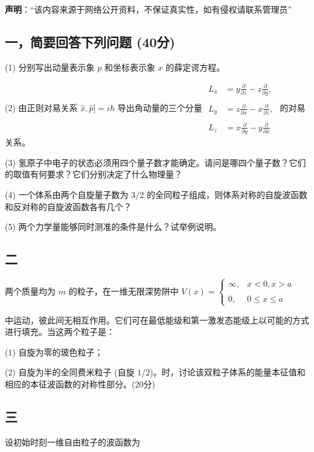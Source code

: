 
\textbf{声明}：“该内容来源于网络公开资料，不保证真实性，如有侵权请联系管理员”

\subsection{一，简要回答下列问题 (40分)}

(1) 分别写出动量表示象 $p$ 和坐标表示象 $x$ 的薛定谔方程。

(2) 由正则对易关系 $\hat{x}, \hat{p}] = i\hbar$ 导出角动量的三个分量
$\begin{aligned}    L_x &= y \frac{\partial}{\partial z} - z \frac{\partial}{\partial y}, \\\\    L_y &= z \frac{\partial}{\partial x} - x \frac{\partial}{\partial z}, \\\\    L_z &= x \frac{\partial}{\partial y} - y \frac{\partial}{\partial x}\end{aligned}$
的对易关系。

(3) 氢原子中电子的状态必须用四个量子数才能确定。请问是哪四个量子数？它们的取值有何要求？它们分别决定了什么物理量？

(4) 一个体系由两个自旋量子数为 $3/2$ 的全同粒子组成，则体系对称的自旋波函数和反对称的自旋波函数各有几个？

(5) 两个力学量能够同时测准的条件是什么？试举例说明。

\subsection{二}两个质量均为 $m$ 的粒子，在一维无限深势阱中
$V(x) = \begin{cases} \infty, & x < 0, x > a \\\\0, & 0 \leq x \leq a \end{cases}$

中运动，彼此间无相互作用。它们可在最低能级和第一激发态能级上以可能的方式进行填充。当这两个粒子是：

(1) 自旋为零的玻色粒子；

(2) 自旋为半的全同费米粒子 (自旋 $1/2$)。时，讨论该双粒子体系的能量本征值和相应的本征波函数的对称性部分。(20分)

\subsection{三}设初始时刻一维自由粒子的波函数为

